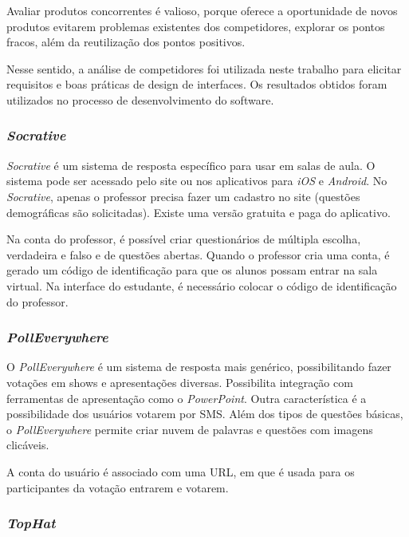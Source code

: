 Avaliar produtos concorrentes é valioso, porque oferece a oportunidade de novos
produtos evitarem problemas existentes dos competidores, explorar os pontos
fracos, além da reutilização dos pontos positivos.

Nesse sentido, a análise de competidores foi utilizada neste trabalho para elicitar requisitos e boas práticas
de design de interfaces. %
Os resultados obtidos foram utilizados no processo de desenvolvimento do software.

\subsubsection{\textit{Socrative}}

\textit{Socrative} é um sistema de resposta específico para usar em salas de aula. O sistema pode ser
acessado pelo site ou nos aplicativos para \textit{iOS} e \textit{Android}. No \textit{Socrative}, apenas o professor
precisa fazer um cadastro no site (questões demográficas são solicitadas). Existe uma versão
gratuita e paga do aplicativo.

Na conta do professor, é possível criar questionários de múltipla escolha, verdadeira e falso e
de questões abertas. Quando o professor cria uma conta, é gerado um código de identificação
para que os alunos possam entrar na sala virtual. Na interface do estudante, é necessário
colocar o código de identificação do professor.

\subsubsection{\textit{PollEverywhere}}

O \textit{PollEverywhere} é um sistema de resposta mais genérico, possibilitando fazer votações em
shows e apresentações diversas. Possibilita integração com ferramentas de apresentação
como o \textit{PowerPoint}. Outra característica é a possibilidade dos usuários votarem por SMS.
Além dos tipos de questões básicas, o \textit{PollEverywhere} permite criar nuvem de palavras e
questões com imagens clicáveis.

A conta do usuário é associado com uma URL, em que é usada para os participantes
da votação entrarem e votarem.

\subsubsection{\textit{TopHat}}

